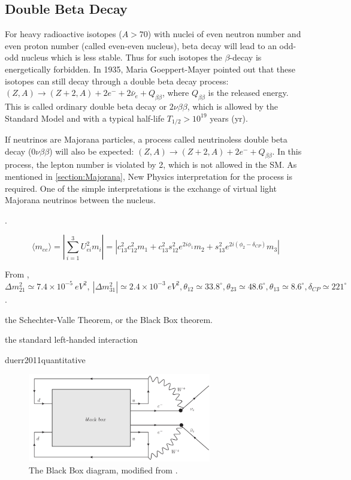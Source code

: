 \subsection{Double Beta Decay}

For heavy radioactive isotopes ($A>70$) with nuclei of even neutron number and even proton number (called even-even nucleus), beta decay will lead to an odd-odd nucleus which is less stable. Thus for such isotopes the $\beta$-decay is energetically forbidden. In 1935, Maria Goeppert-Mayer pointed out that these isotopes can still decay through a double beta decay process: $(Z,A) \to (Z+2,A)+2e^{-}+2\bar{\nu}_e+Q_{\beta\beta}$, where $Q_{\beta\beta}$ is the released energy. This is called ordinary double beta decay or $2\nu\beta\beta$, which is allowed by the Standard Model and with a typical half-life $T_{1/2}>10^{19}$ years (yr)\cite{povh2008particles,martin2019nuclear}.

If neutrinos are Majorana particles, a process called neutrinoless double beta decay ($0\nu\beta\beta$) will also be expected: $(Z,A) \to (Z+2,A)+2e^{-}+Q_{\beta\beta}$. In this process, the lepton number is violated by 2, which is not allowed in the SM. As mentioned in \ref{section:Majorana}, New Physics interpretation for the process is required. One of the simple interpretations is the exchange of virtual light Majorana neutrinos between the nucleus. 

\cite{dolinski2019neutrinoless}.

\begin{equation}
\langle m_{ee} \rangle = |\sum_{i=1}^3 U^2_{ei}m_i|= |c^2_{13}c^2_{12}m_1+c^2_{13}s^2_{12}e^{2i\phi_1}m_2+s^2_{13}e^{2i(\phi_2-\delta_{CP})}m_3|
\end{equation}

From \cite{pdg2018}, $\Delta m^2_{21}\simeq 7.4\times 10^{-5}~eV^2,~|\Delta m^2_{31}|\simeq 2.4\times 10^{-3}~eV^2 ,\theta_{12}\simeq 33.8^\circ, \theta_{23}\simeq 48.6^\circ,\theta_{13}\simeq 8.6^\circ, \delta_{CP}\simeq 221^\circ$.

the Schechter-Valle Theorem, or the Black Box theorem.

the standard left-handed interaction

duerr2011quantitative  




\begin{figure}[htbp]
	\centering	
	\includegraphics[width=8cm]{blackbox.png}
	\caption{ The Black Box diagram, modified from \cite{schechter1982neutrinoless}.}
	\label{blackbox}
\end{figure}





